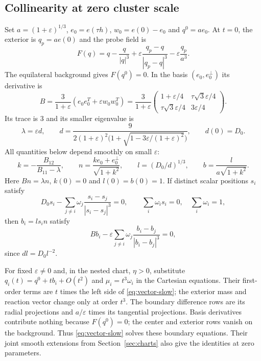\documentclass[11pt,a4paper]{article}
\numberwithin{equation}{section}
\theoremstyle{remark}
\newcommand{\eps}{\varepsilon}
\begin{document}
\subsection{Collinearity at zero cluster scale}
Set $a=(1+\eps)^{1/3}$, $e_0=e(\tau h)$, $w_0=e(0)-e_0$ and $q^0=ae_0$.
At $t=0$, the exterior is $q_p=ae(0)$ and the probe field is
\[
 F(q)=q-\frac q{|q|^3}
      +\eps\frac{q_p-q}{|q_p-q|^3}-\eps\frac{q_p}{a^3}.
\]
The equilateral background gives $F(q^0)=0$. In the basis $(e_0,e_0^\perp)$ its derivative is
\begin{equation}\label{eq:bg-matrix}
 B=\frac3{1+\eps}(e_0e_0^T+\eps w_0w_0^T)
  =\frac3{1+\eps}
   \begin{pmatrix}1+\eps/4&\tau\sqrt3\eps/4\\
                   \tau\sqrt3\eps/4&3\eps/4\end{pmatrix}.
\end{equation}
Its trace is $3$ and its smaller eigenvalue is
\begin{equation}\label{eq:slow}
 \lambda=\eps d,\qquad
 d=\frac9{2(1+\eps)^2\bigl(1+\sqrt{1-3\eps/(1+\eps)^2}\bigr)},
 \qquad d(0)=D_0.
\end{equation}
All quantities below depend smoothly on small $\eps$:
\[
 k=-\frac{B_{12}}{B_{11}-\lambda},\qquad
 n=\frac{ke_0+e_0^\perp}{\sqrt{1+k^2}},\qquad
 l=(D_0/d)^{1/3},\qquad b=\frac{l}{a\sqrt{1+k^2}}.
\]
Here $Bn=\lambda n$, $k(0)=0$ and $l(0)=b(0)=1$.
If distinct scalar positions $s_i$ satisfy
\begin{equation}\label{eq:scalar-slow}
 D_0s_i-\sum_{j\ne i}\omega_j\frac{s_i-s_j}{|s_i-s_j|^3}=0,
 \qquad \sum_i\omega_i s_i=0,\quad\sum_i\omega_i=1,
\end{equation}
then $b_i=ls_i n$ satisfy
\begin{equation}\label{eq:vector-slow}
 Bb_i-\eps\sum_{j\ne i}\omega_j\frac{b_i-b_j}{|b_i-b_j|^3}=0,
\end{equation}
since $dl=D_0l^{-2}$.

For fixed $\eps\ne0$ and, in the nested chart, $\eta>0$, substitute
$q_i(t)=q^0+tb_i+O(t^2)$ and $\mu_i=t^3\omega_i$ in the Cartesian equations.
Their first-order terms are $t$ times the left side of \eqref{eq:vector-slow}; the exterior mass and reaction vector change only at order $t^3$.
The boundary difference rows are its radial projections and $a/\eps$ times its tangential projections. Basis derivatives contribute nothing because $F(q^0)=0$; the center and exterior rows vanish on the background.
Thus \eqref{eq:vector-slow} solves these boundary equations. Their joint smooth extensions from Section~\ref{sec:charts} also give the identities at zero parameters.
\end{document}
